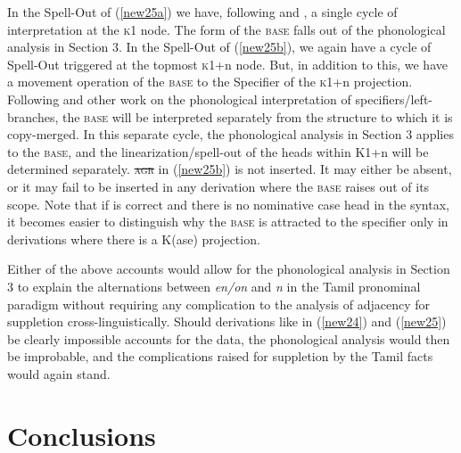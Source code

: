 \documentclass[output=paper,colorlinks,citecolor=brown,
]{langscibook}
\begin{document}
In the Spell-Out of (\ref{new25a}) we have, following \citet{Moskal2015} and \citet{moskal2016towards}, a single cycle of interpretation at the \textsc{k}1 node. The form of the \textsc{base} falls out of the phonological analysis in Section 3. In the Spell-Out of (\ref{new25b}), we again have a cycle of Spell-Out triggered at the topmost \textsc{k}1+n node. But, in addition to this, we have a movement operation of the \textsc{base} to the Specifier of the \textsc{k}1+n projection. Following \citet{Johnson2004} and other work on the phonological interpretation of specifiers/left-branches, the \textsc{base} will be interpreted separately from the structure to which it is copy-merged. In this separate cycle, the phonological analysis in Section 3 applies to the \textsc{base}, and the linearization/spell-out of the heads within K1+n will be determined separately. \textsc{\sout{agr}} in (\ref{new25b}) is not inserted. It may either be absent, or it may fail to be inserted in any derivation where the \textsc{base} raises out of its scope. Note that if \citet{mcfadden2018aba} is correct and there is no nominative case head in the syntax, it becomes easier to distinguish why the \textsc{base} is attracted to the specifier only in derivations where there is a K(ase) projection.

Either of the above accounts would allow for the phonological analysis in Section 3 to explain the alternations between \textit{en/on} and \textit{n} in the Tamil pronominal paradigm without requiring any complication to the analysis of adjacency for suppletion cross-linguistically. Should derivations like in (\ref{new24}) and (\ref{new25}) be clearly impossible accounts for the data, the phonological analysis would then be improbable, and the complications raised for suppletion by the Tamil facts would again stand.

\section{Conclusions}
\end{document}
